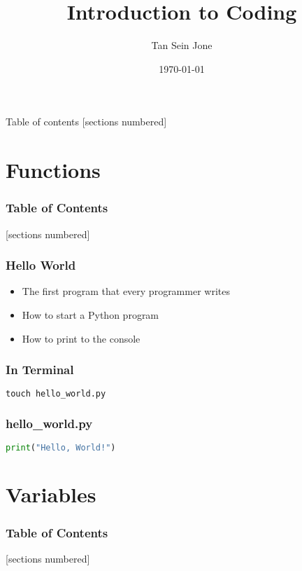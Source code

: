 \documentclass[serif, 9pt, aspectratio=32]{beamer}
\title{Introduction to Coding}
\date{\today}
\author{Tan Sein Jone}
\institute{University of British Columbia}
\begin{document}
\maketitle

\begin{frame}{Table of contents}
    [sections numbered]
    \tableofcontents[hideallsubsections]
\end{frame}

\section{Functions}

\begin{frame}
    \frametitle{Table of Contents}
    [sections numbered]
    \tableofcontents[currentsection]
\end{frame}

\begin{frame}
    \centering
    \frametitle{Hello World}
    \begin{itemize}
        \setlength{\itemsep}{3em}
        \item The first program that every programmer writes
        \item How to start a Python program
        \item How to print to the console
    \end{itemize}
\end{frame}

\begin{frame}[fragile]
    \frametitle{In Terminal}
    \begin{lstlisting}[language=Python]
        touch hello_world.py
    \end{lstlisting}
\end{frame}

\begin{frame}[fragile]
    \frametitle{hello\_world.py}
    \begin{lstlisting}[language=Python]
        print("Hello, World!")
    \end{lstlisting}
\end{frame}

\section{Variables}

\begin{frame}
    \frametitle{Table of Contents}
    [sections numbered]
    \tableofcontents[currentsection]
\end{frame}
\end{document}
